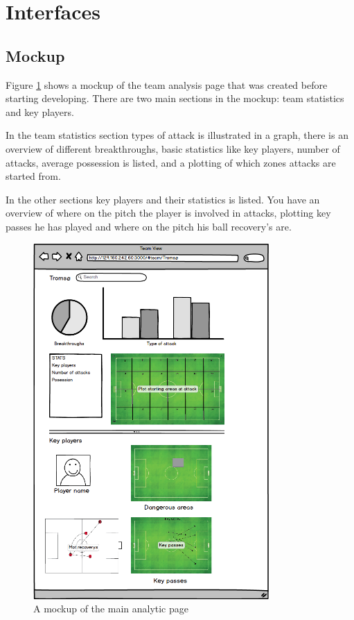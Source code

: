 \section{Interfaces}

\subsection{Mockup}

Figure \ref{fig:mockup} shows a mockup of the team analysis page that was created before starting developing. There are two main sections in the mockup: team statistics and key players. 

In the team statistics section types of attack is illustrated in a graph, there is an overview of different breakthroughs, basic statistics like key players, number of attacks, average possession is listed, and a plotting of which zones attacks are started from.

In the other sections key players and their statistics is listed. You have an overview of where on the pitch the player is involved in attacks, plotting key passes he has played and where on the pitch his ball recovery’s are.

\begin{figure}[ht!]
\centering
\includegraphics[width=90mm]{images/general/mockup.png}
\caption{A mockup of the main analytic page}
\label{fig:mockup}
\end{figure}

